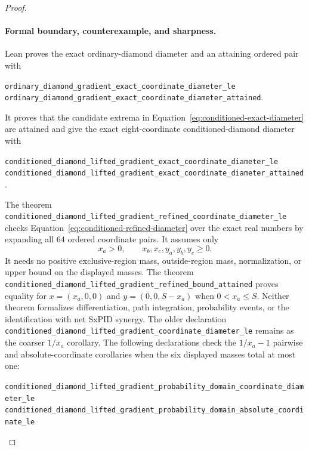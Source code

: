 \documentclass[11pt]{article}
\theoremstyle{definition}
\begin{document}
\begin{proof}
	\paragraph{Formal boundary, counterexample, and sharpness.}
	Lean proves the exact ordinary-diamond diameter and an attaining ordered pair with
	\begin{center}
	\begin{minipage}{0.96\linewidth}
	\raggedright\small
	\nolinkurl{ordinary_diamond_gradient_exact_coordinate_diameter_le}\\
	\nolinkurl{ordinary_diamond_gradient_exact_coordinate_diameter_attained}.
	\end{minipage}
	\end{center}
	It proves that the candidate extrema in Equation~\eqref{eq:conditioned-exact-diameter} are
	attained and give the exact eight-coordinate conditioned-diamond diameter with
	\begin{center}
	\begin{minipage}{0.96\linewidth}
	\raggedright\small
	\nolinkurl{conditioned_diamond_lifted_gradient_exact_coordinate_diameter_le}\\
	\nolinkurl{conditioned_diamond_lifted_gradient_exact_coordinate_diameter_attained}.
	\end{minipage}
	\end{center}
	The theorem
	\nolinkurl{conditioned_diamond_lifted_gradient_refined_coordinate_diameter_le}
	checks Equation~\eqref{eq:conditioned-refined-diameter} over the exact real numbers by expanding
	all $64$ ordered coordinate pairs.  It assumes
only
\begin{equation}
  x_a>0,
  \qquad
  x_b,x_c,y_a,y_b,y_c\ge0.
\end{equation}
It needs no positive exclusive-region mass, outside-region mass, normalization, or upper bound on
the displayed masses.  The theorem
\nolinkurl{conditioned_diamond_lifted_gradient_refined_bound_attained}
	proves equality for $x=(x_a,0,0)$ and $y=(0,0,S-x_a)$ when $0<x_a\le S$.  Neither theorem
	formalizes differentiation, path integration, probability events, or the identification with net
	SxPID synergy.
	The older declaration
	\nolinkurl{conditioned_diamond_lifted_gradient_coordinate_diameter_le}
	remains as the coarser $1/x_a$ corollary.
The following declarations check the $1/x_a-1$ pairwise and absolute-coordinate corollaries when
the six displayed masses total at most one:
\begin{center}
\begin{minipage}{0.96\linewidth}
\raggedright\small
\nolinkurl{conditioned_diamond_lifted_gradient_probability_domain_coordinate_diameter_le}\\
\nolinkurl{conditioned_diamond_lifted_gradient_probability_domain_absolute_coordinate_le}
\end{minipage}
\end{center}


\end{proof}
\end{document}
